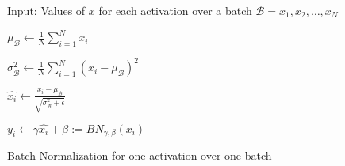 \documentclass[a4paper]{article}
\begin{document}
	\begin{algorithm}
		Input: Values of \(x\) for each activation over a batch \(\mathcal{B} = {x_1, x_2, \dots, x_N}\)
		
		\(\mu_\mathcal{B} \leftarrow \frac{1}{N} \sum_{i = 1}^{N}x_i\)
		
		\(\sigma_\mathcal{B}^2 \leftarrow \frac{1}{N} \sum_{i = 1}^{N}(x_i - \mu_\mathcal{B})^2\)
		
		\(\hat{x_i} \leftarrow \frac{x_i - \mu_\mathcal{B}}{\sqrt{\sigma_\mathcal{B}^2 + \epsilon}}\)
		
		\(y_i \leftarrow \gamma\hat{x_i} + \beta := BN_{\gamma, \beta}(x_i)\)
		
		\caption{Batch Normalization for one activation over one batch}
	\end{algorithm}
	
	
	\pagebreak
	
	
	
	
\end{document}
